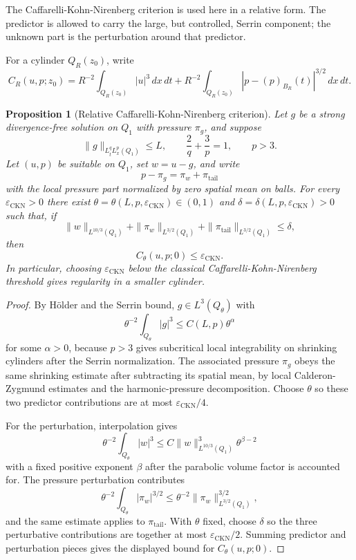 \documentclass[11pt]{article}
\newtheorem{proposition}[theorem]{Proposition}
\begin{document}
The Caffarelli-Kohn-Nirenberg criterion is used here in a relative form.  The
predictor is allowed to carry the large, but controlled, Serrin component; the
unknown part is the perturbation around that predictor.

For a cylinder \(Q_R(z_0)\), write
\[
C_R(u,p;z_0)
=
R^{-2}\int_{Q_R(z_0)}|u|^3\,dx\,dt
+
R^{-2}\int_{Q_R(z_0)}
|p-(p)_{B_R}(t)|^{3/2}\,dx\,dt.
\]

\begin{proposition}[Relative Caffarelli-Kohn-Nirenberg criterion]
Let \(g\) be a strong divergence-free solution on \(Q_1\) with pressure \(\pi_g\),
and suppose
\[
\|g\|_{L^q_tL^p_x(Q_1)}\le L,
\qquad
\frac2q+\frac3p=1,
\qquad
p>3.
\]
Let \((u,p)\) be suitable on \(Q_1\), set \(w=u-g\), and write
\[
p-\pi_g=\pi_w+\pi_{\mathrm{tail}}
\]
with the local pressure part normalized by zero spatial mean on balls.  For every
\(\varepsilon_{\mathrm{CKN}}>0\) there exist
\(\theta=\theta(L,p,\varepsilon_{\mathrm{CKN}})\in(0,1)\) and
\(\delta=\delta(L,p,\varepsilon_{\mathrm{CKN}})>0\) such that, if
\[
\|w\|_{L^{10/3}(Q_1)}
+
\|\pi_w\|_{L^{3/2}(Q_1)}
+
\|\pi_{\mathrm{tail}}\|_{L^{3/2}(Q_1)}
\le \delta,
\]
then
\[
C_\theta(u,p;0)\le \varepsilon_{\mathrm{CKN}}.
\]
In particular, choosing \(\varepsilon_{\mathrm{CKN}}\) below the classical
Caffarelli-Kohn-Nirenberg threshold gives regularity in a smaller cylinder.
\end{proposition}

\begin{proof}
By Hölder and the Serrin bound, \(g\in L^3(Q_\theta)\) with
\[
\theta^{-2}\int_{Q_\theta}|g|^3
\le
C(L,p)\theta^\alpha
\]
for some \(\alpha>0\), because \(p>3\) gives subcritical local integrability on
shrinking cylinders after the Serrin normalization.  The associated pressure
\(\pi_g\) obeys the same shrinking estimate after subtracting its spatial mean,
by local Calderon-Zygmund estimates and the harmonic-pressure decomposition.
Choose \(\theta\) so these two predictor contributions are at most
\(\varepsilon_{\mathrm{CKN}}/4\).

For the perturbation, interpolation gives
\[
\theta^{-2}\int_{Q_\theta}|w|^3
\le
C\|w\|_{L^{10/3}(Q_1)}^3\theta^{\beta-2}
\]
with a fixed positive exponent \(\beta\) after the parabolic volume factor is
accounted for.  The pressure perturbation contributes
\[
\theta^{-2}\int_{Q_\theta}|\pi_w|^{3/2}
\le
\theta^{-2}\|\pi_w\|_{L^{3/2}(Q_1)}^{3/2},
\]
and the same estimate applies to \(\pi_{\mathrm{tail}}\).  With \(\theta\) fixed,
choose \(\delta\) so the three perturbative contributions are together at most
\(\varepsilon_{\mathrm{CKN}}/2\).  Summing predictor and perturbation pieces gives
the displayed bound for \(C_\theta(u,p;0)\).
\end{proof}
\end{document}

